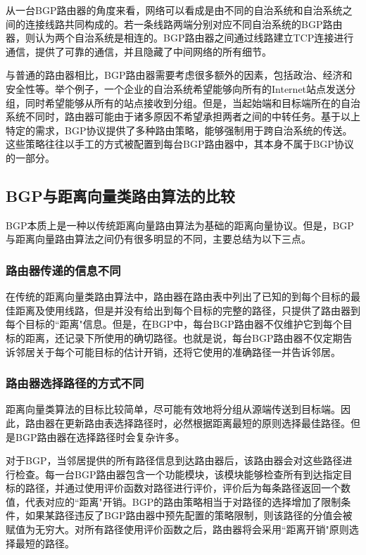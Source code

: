 \documentclass[11pt,twocolumn]{article}
\begin{document}
从一台BGP路由器的角度来看，网络可以看成是由不同的自治系统和自治系统之间的连接线路共同构成的。若一条线路两端分别对应不同自治系统的BGP路由器，则认为两个自治系统是相连的。BGP路由器之间通过线路建立TCP连接进行通信，提供了可靠的通信，并且隐藏了中间网络的所有细节\cite{BGP4}。

与普通的路由器相比，BGP路由器需要考虑很多额外的因素，包括政治、经济和安全性等\cite{CN}。举个例子，一个企业的自治系统希望能够向所有的Internet站点发送分组，同时希望能够从所有的站点接收到分组。但是，当起始端和目标端所在的自治系统不同时，路由器可能由于诸多原因不希望承担两者之间的中转任务。基于以上特定的需求，BGP协议提供了多种路由策略，能够强制用于跨自治系统的传送。这些策略往往以手工的方式被配置到每台BGP路由器中，其本身不属于BGP协议的一部分\cite{CN}。

\subsection{BGP与距离向量类路由算法的比较}
BGP本质上是一种以传统距离向量路由算法为基础的距离向量协议。但是，BGP与距离向量路由算法之间仍有很多明显的不同，主要总结为以下三点。

\subsubsection{路由器传递的信息不同}

在传统的距离向量类路由算法中，路由器在路由表中列出了已知的到每个目标的最佳距离及使用线路，但是并没有给出到每个目标的完整的路径，只提供了路由器到每个目标的``距离"信息。但是，在BGP中，每台BGP路由器不仅维护它到每个目标的距离，还记录下所使用的确切路径。也就是说，每台BGP路由器不仅定期告诉邻居关于每个可能目标的估计开销，还将它使用的准确路径一并告诉邻居。

\subsubsection{路由器选择路径的方式不同}

距离向量类算法的目标比较简单，尽可能有效地将分组从源端传送到目标端。因此，路由器在更新路由表选择路径时，必然根据距离最短的原则选择最佳路径。但是BGP路由器在选择路径时会复杂许多。

对于BGP，当邻居提供的所有路径信息到达路由器后，该路由器会对这些路径进行检查。每一台BGP路由器包含一个功能模块，该模块能够检查所有到达指定目标的路径，并通过使用评价函数对路径进行评价，评价后为每条路径返回一个数值，代表对应的``距离"开销\cite{CN}。BGP的路由策略相当于对路径的选择增加了限制条件\cite{Policy}，如果某路径违反了BGP路由器中预先配置的策略限制，则该路径的分值会被赋值为无穷大。对所有路径使用评价函数之后，路由器将会采用``距离开销"原则选择最短的路径。
\end{document}
